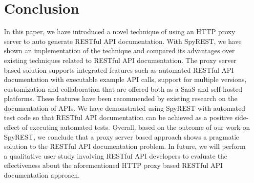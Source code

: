 \documentclass[conference]{IEEEtran}
\begin{document}
\section{Conclusion}
In this paper, we have introduced a novel technique of using an HTTP proxy server to auto generate RESTful API documentation. With SpyREST, we have shown an implementation of the technique and compared its advantages over existing techniques related to RESTful API documentation. The proxy server based solution supports integrated features such as automated RESTful API documentation with executable example API calls, support for multiple versions, customization and collaboration that are offered both as a SaaS and self-hosted platforms. These features have been recommended by existing research on the documentation of APIs. We have demonstrated using SpyREST with automated test code so that RESTful API documentation can be achieved as a positive side-effect of executing automated tests. Overall, based on the outcome of our work on SpyREST, we conclude that a proxy server based approach shows a pragmatic solution to the RESTful API documentation problem. In future, we will perform a qualitative user study involving RESTful API developers to evaluate the effectiveness about the aforementioned HTTP proxy based RESTful API documentation approach.


\end{document}
